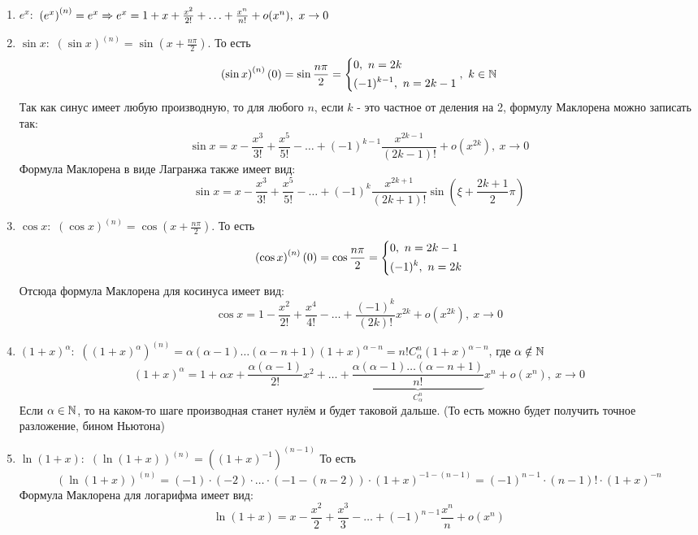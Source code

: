 \begin{enumerate}
	\item $e^x:$ $\left(e^x\right)^{(n)} = e^x \Rightarrow
		e^x = 1 + x + \frac{x^2}{2!} + \ldots +
		\frac{x^n}{n!} + o(x^n),\ x \to 0$
	
	\item $\sin x:$ $\left(\sin x\right)^{(n)} =
		\sin(x + \frac{n\pi}{2})$. То есть
		\[
			\left(\sin x\right)^{(n)}(0) = \sin
			\frac{n\pi}{2} =
			\left\{\begin{aligned}
					&{0,\ n = 2k}
					\\
					&{(-1)^{k - 1},\ n = 2k - 1}
				\end{aligned}\right.,\ k \in \mathbb{N}
		\]
		Так как синус имеет любую производную,
		то для любого $n$, если $k$ - это частное от
		деления на 2, формулу Маклорена можно записать так:
		\[
			\sin x = x - \frac{x^3}{3!} + \frac{x^5}{5!} -
			\ldots + (-1)^{k - 1} \frac{x^{2k - 1}}{(2k - 1)!}
			+ o(x^{2k}),\ x \to 0
		\]
		Формула Маклорена в виде Лагранжа также имеет вид:
		\[
			\sin x = x - \frac{x^3}{3!} + \frac{x^5}{5!} -
			\ldots + (-1)^{k} \frac{x^{2k + 1}}{(2k + 1)!}
			\sin \left(\xi + \frac{2k + 1}{2}\pi\right)
		\]
	
	\item $\cos x:$ $\left(\cos x\right)^{(n)} =
		\cos(x + \frac{n\pi}{2})$. То есть
		\[
			\left(\cos x\right)^{(n)}(0) =
			\cos \frac{n\pi}{2} =
			\left\{\begin{aligned}
				&{0,\ n = 2k - 1}
				\\
				&{(-1)^k,\ n = 2k}
			\end{aligned}\right.
		\]
		Отсюда формула Маклорена для косинуса имеет вид:
		\[
			\cos x = 1 - \frac{x^2}{2!} + \frac{x^4}{4!} - \ldots + \frac{(-1)^k}{(2k)!}x^{2k} + o(x^{2k}),\ x \to 0
		\]
	
	\item $(1 + x)^\alpha:$ $\left((1 + x)^\alpha\right)^{(n)} =
		\alpha(\alpha - 1)\ldots(\alpha - n + 1)(1 + x)^{\alpha - n}
		= n! C_{\alpha}^n (1 + x)^{\alpha - n}$, где
		$\alpha \notin \mathbb{N}$
		\[
			(1 + x)^\alpha = 1 + \alpha x +
			\frac{\alpha (\alpha - 1)}{2!}x^2 + \ldots +
			\underbrace{\frac{\alpha (\alpha - 1) \ldots
			(\alpha - n + 1)}{n!}}_{C_\alpha^n}x^n + o(x^n),
			\ x \to 0
		\]
		Если $\alpha \in \mathbb{N}$, то на каком-то шаге производная
		станет нулём и будет таковой дальше.
		(То есть можно будет получить точное разложение,
		бином Ньютона)
	
	\item $\ln (1 + x):$ $\left(\ln (1 + x)\right)^{(n)} =
		\left((1 + x)^{-1}\right)^{(n - 1)}$
		То есть
		\[
			\left(\ln (1 + x)\right)^{(n)}= (-1) \cdot
			(-2) \cdot \ldots \cdot (-1 - (n - 2)) \cdot
			(1 + x)^{-1 - (n - 1)} = (-1)^{n - 1} \cdot
			(n - 1)! \cdot (1 + x)^{-n}
		\]
		Формула Маклорена для логарифма имеет вид:
		\[
			\ln(1 + x) = x - \frac{x^2}{2} +
			\frac{x^3}{3} - \ldots + (-1)^{n - 1}
			\frac{x^n}{n} + o(x^n)
		\]
\end{enumerate}


